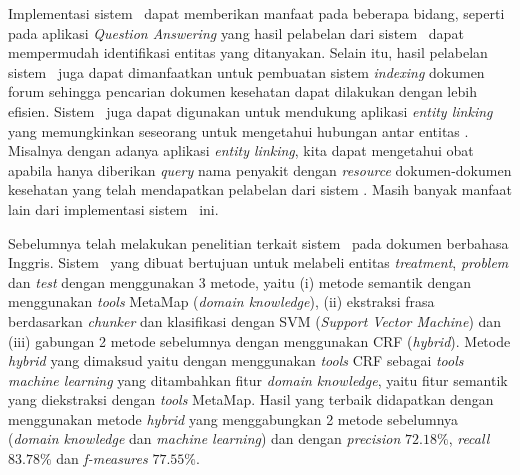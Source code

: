 Implementasi sistem \mer~dapat memberikan manfaat pada beberapa bidang, seperti pada aplikasi \textit{Question Answering} \citep{abacha2011medical} yang hasil pelabelan dari sistem \mer~dapat mempermudah identifikasi entitas yang ditanyakan. Selain itu, hasil pelabelan sistem \mer~juga dapat dimanfaatkan untuk pembuatan sistem \textit{indexing} dokumen forum sehingga pencarian dokumen kesehatan dapat dilakukan dengan lebih efisien. Sistem \mer~juga dapat digunakan untuk mendukung aplikasi \textit{entity linking} yang memungkinkan seseorang untuk mengetahui hubungan antar entitas \citep{hachey2013evaluating}. Misalnya dengan adanya aplikasi \textit{entity linking}, kita dapat mengetahui obat apabila hanya diberikan \textit{query} nama penyakit dengan \textit{resource} dokumen-dokumen kesehatan yang telah mendapatkan pelabelan dari sistem \mer. Masih banyak manfaat lain dari implementasi sistem \mer~ini.

Sebelumnya \cite{abacha2011medical} telah melakukan penelitian terkait sistem \mer~pada dokumen berbahasa Inggris. Sistem \mer~yang dibuat bertujuan untuk melabeli entitas \textit{treatment}, \textit{problem} dan \textit{test} dengan menggunakan 3 metode, yaitu (i) metode semantik dengan menggunakan \textit{tools} MetaMap (\textit{domain knowledge}), (ii) ekstraksi frasa berdasarkan \textit{chunker} dan klasifikasi dengan SVM (\textit{Support Vector Machine}) dan (iii) gabungan 2 metode sebelumnya dengan menggunakan CRF (\textit{hybrid}). Metode \textit{hybrid} yang dimaksud yaitu dengan menggunakan \textit{tools} CRF sebagai \textit{tools machine learning} yang ditambahkan fitur \textit{domain knowledge}, yaitu fitur semantik yang diekstraksi dengan \textit{tools} MetaMap. Hasil yang terbaik didapatkan dengan menggunakan metode \textit{hybrid} yang menggabungkan 2 metode sebelumnya (\textit{domain knowledge} dan \textit{machine learning}) dan dengan \textit{precision} $ 72.18\% $, \textit{recall} $ 83.78\% $ dan \textit{f-measures} $ 77.55\% $.

